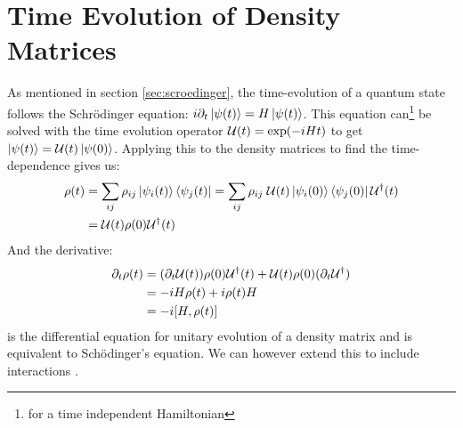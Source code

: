 \section{Time Evolution of Density Matrices} \label{sec: Time Evolution}
As mentioned in section \ref{sec:scroedinger}, the time-evolution of a quantum state follows the Schrödinger equation: $i\partial_t\ket{\psi(t)} = H\ket{\psi(t)}$. This equation can\footnote{for a time independent Hamiltonian} be solved with the time evolution operator $\mathcal{U}(t) = \exp(-iHt)$ to get $\ket{\psi(t)} = \mathcal{U}(t)\ket{\psi(0)}$. Applying this to the density matrices to find the time-dependence gives us:
\begin{align}
    \rho(t) &= \sum_{ij} \rho_{ij} \ket{\psi_i(t)}\bra{\psi_j(t)} = \sum_{ij} \rho_{ij} \; \mathcal{U}(t) \ket{\psi_i(0)}\bra{\psi_j(0)} \mathcal{U}^\dagger(t) \nonumber \\
    &= \mathcal{U}(t) \rho(0) \mathcal{U}^\dagger(t)
\end{align}
And the derivative:
\begin{align}
    \partial_t \rho(t) &= (\partial_t \unitary(t)) \rho(0)\unitary^\dagger(t) + \unitary(t)\rho(0)(\partial_t \unitary^\dagger) \nonumber \\
    &= -iH \rho(t) +i \rho(t) H \nonumber \\
    &= - i \comm{H}{\rho(t)}
\end{align}
is the differential equation for unitary evolution of a density matrix and is equivalent to Schödinger's equation. We can however extend this to include interactions \cite{manzano_short_2020}. 

